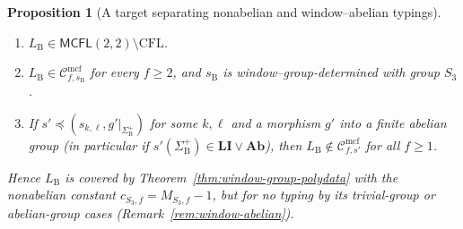 \documentclass[11pt]{article}
\numberwithin{equation}{section}
\theoremstyle{plain}
\newtheorem{proposition}[theorem]{Proposition}
\theoremstyle{definition}
\theoremstyle{remark}
\newcommand{\Cmcf}[2]{\mathcal{C}^{\mathrm{mcf}}_{#1,#2}}
\begin{document}
\begin{proposition}[A target separating nonabelian and window--abelian typings]
\label{prop:nonabelian-needed-target}
\begin{enumerate}[label=\textup{(\roman*)},leftmargin=*]
\item $L_{\mathrm B}\in\mathsf{MCFL}(2,2)\setminus\mathrm{CFL}$.
\item $L_{\mathrm B}\in\Cmcf{f}{s_{\mathrm B}}$ for every $f\ge2$, and $s_{\mathrm B}$ is
window--group-determined with group $S_3$.
\item If $s'\preceq(s_{k,\ell},g'|_{\Sigma_{\mathrm B}^+})$ for some $k,\ell$ and a
morphism $g'$ into a finite \emph{abelian} group (in particular if
$s'(\Sigma_{\mathrm B}^+)\in\mathbf{LI}\vee\mathbf{Ab}$), then
$L_{\mathrm B}\notin\Cmcf{f}{s'}$ for all $f\ge1$.
\end{enumerate}
Hence $L_{\mathrm B}$ is covered by Theorem~\ref{thm:window-group-polydata} with the
nonabelian constant $c_{S_3,f}=M_{S_3,f}-1$, but for no typing by its trivial-group or
abelian-group cases (Remark~\ref{rem:window-abelian}).
\end{proposition}
\end{document}
